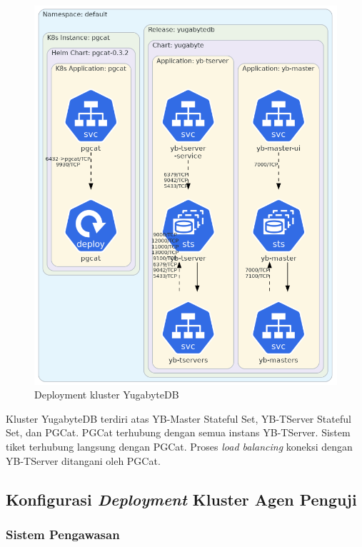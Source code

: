 \begin{figure}[htbp]
    \centering
    \includegraphics[width=1\textwidth]{resources/chapter-4/yugabyte.png}
    \caption{Deployment kluster YugabyteDB}
    \label{fig:deployment-yugabyte}
\end{figure}

Kluster YugabyteDB terdiri atas YB-Master Stateful Set, YB-TServer Stateful Set, dan PGCat. PGCat terhubung dengan semua instans YB-TServer. Sistem tiket terhubung langsung dengan PGCat. Proses \textit{load balancing} koneksi dengan YB-TServer ditangani oleh PGCat.

\pagebreak

\subsection{Konfigurasi \textit{Deployment} Kluster Agen Penguji}

\subsubsection{Sistem Pengawasan}

